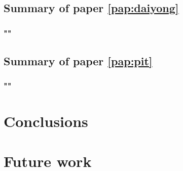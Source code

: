 \section{Summary of paper \ref{pap:daiyong}}
\subsection*{""}

\section{Summary of paper \ref{pap:pit}}
\subsection*{""}

\chapter{Conclusions\label{ch:conclusions}}


\chapter{Future work\label{ch:future_work}}

